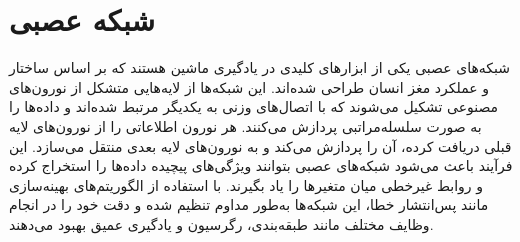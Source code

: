 \cite{ELKASSAS2021113679,}







\section{شبکه عصبی}
شبکه‌های عصبی یکی از ابزارهای کلیدی در یادگیری ماشین هستند که بر اساس ساختار و عملکرد مغز انسان طراحی شده‌اند. این شبکه‌ها از لایه‌هایی متشکل از نورون‌های مصنوعی تشکیل می‌شوند که با اتصال‌های وزنی به یکدیگر مرتبط شده‌اند و داده‌ها را به صورت سلسله‌مراتبی پردازش می‌کنند. هر نورون اطلاعاتی را از نورون‌های لایه قبلی دریافت کرده، آن را پردازش می‌کند و به نورون‌های لایه بعدی منتقل می‌سازد. این فرآیند باعث می‌شود شبکه‌های عصبی بتوانند ویژگی‌های پیچیده داده‌ها را استخراج کرده و روابط غیرخطی میان متغیرها را یاد بگیرند. با استفاده از الگوریتم‌های بهینه‌سازی مانند پس‌انتشار خطا، این شبکه‌ها به‌طور مداوم تنظیم شده و دقت خود را در انجام وظایف مختلف مانند طبقه‌بندی، رگرسیون و یادگیری عمیق بهبود می‌دهند.
